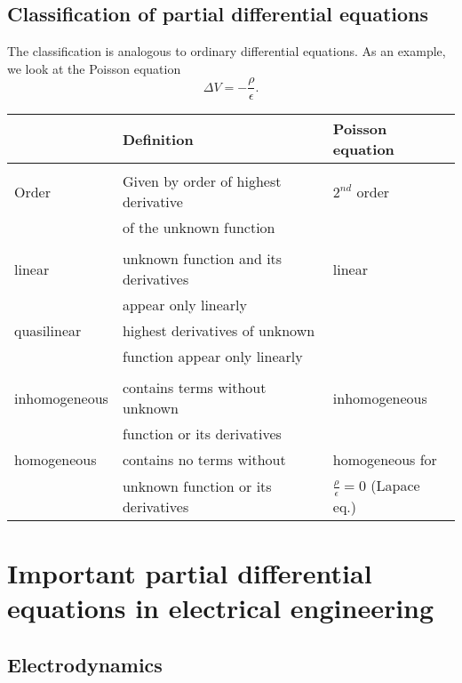 \section{Classification of partial differential equations}

The classification is analogous to ordinary differential equations. As an
example, we look at the Poisson equation%
\[
\Delta V=-\frac{\rho}{\epsilon}.
\]%

\begin{center}%

\begin{tabular}
[c]{l|ll}
& Definition & Poisson equation\\\hline
&  & \\
Order & Given by order of highest derivative & $2^{nd}$ order\\
& of the unknown function & \\
&  & \\
linear & unknown function and its derivatives & linear\\
& appear only linearly & \\
quasilinear & highest derivatives of unknown & \\
& function appear only linearly & \\
&  & \\
inhomogeneous & contains terms without unknown & inhomogeneous\\
& function or its derivatives & \\
homogeneous & contains no terms without & homogeneous for\\
& unknown function or its derivatives & $\frac{\rho}{\epsilon}=0$ (Lapace eq.)
\end{tabular}%

\end{center}%

\chapter{Important partial differential equations in electrical engineering}

\section{Electrodynamics}

